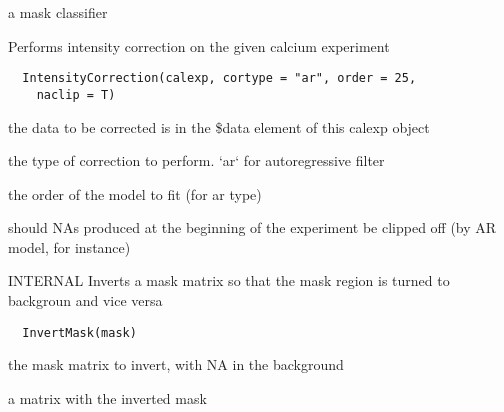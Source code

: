 \documentclass[a4paper]{book}
\begin{document}
%
\begin{Value}
a mask classifier
\end{Value}
%
\begin{Description}\relax
Performs intensity correction on the given calcium
experiment
\end{Description}
%
\begin{Usage}
\begin{verbatim}
  IntensityCorrection(calexp, cortype = "ar", order = 25,
    naclip = T)
\end{verbatim}
\end{Usage}
%
\begin{Arguments}
\begin{ldescription}
\item[\code{calexp}] the data to be corrected is in the \$data
element of this calexp object

\item[\code{cortype}] the type of correction to perform.  `ar`
for autoregressive filter

\item[\code{order}] the order of the model to fit (for ar type)

\item[\code{naclip}] should NAs produced at the beginning of the
experiment be clipped off (by AR model, for instance)
\end{ldescription}
\end{Arguments}
%
\begin{Description}\relax
INTERNAL Inverts a mask matrix so that the mask region is
turned to backgroun and vice versa
\end{Description}
%
\begin{Usage}
\begin{verbatim}
  InvertMask(mask)
\end{verbatim}
\end{Usage}
%
\begin{Arguments}
\begin{ldescription}
\item[\code{mask}] the mask matrix to invert, with NA in the
background
\end{ldescription}
\end{Arguments}
%
\begin{Value}
a matrix with the inverted mask
\end{Value}
\end{document}
